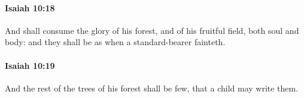 		\paragraph{Isaiah 10:18} %
			\label{ISAIAH-10-18}

			And shall consume the glory of his forest, and of his fruitful field, both soul and body: and they shall be as when a standard-bearer fainteth.


		\paragraph{Isaiah 10:19} %
			\label{ISAIAH-10-19}

			And the rest of the trees of his forest shall be few, that a child may write them.


